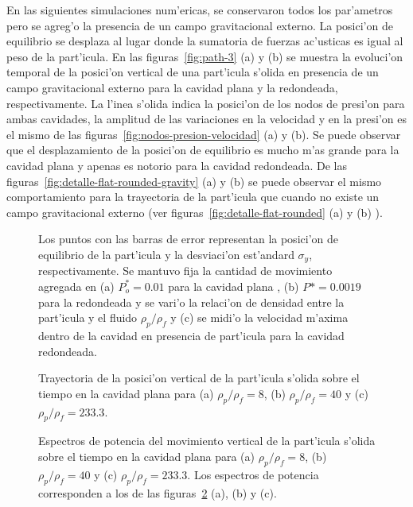 En las siguientes simulaciones num'ericas, se conservaron todos los par'ametros pero se agreg'o
la presencia de un campo gravitacional externo.  La posici'on de equilibrio se desplaza al lugar donde
la sumatoria de fuerzas ac'usticas es igual al peso de la part'icula. En las figuras~\ref{fig:path-3} (a)
y (b)  se muestra la evoluci'on temporal de la posici'on vertical de una part'icula s'olida en presencia 
de un campo gravitacional externo para la cavidad plana y la redondeada, respectivamente. 
La l'inea s'olida indica la posici'on de los nodos de presi'on para ambas cavidades, la amplitud de las variaciones en la
velocidad y en la presi'on es el mismo de las figuras~\ref{fig:nodos-presion-velocidad} (a) y (b).  
Se puede observar que el desplazamiento de la posici'on de equilibrio es mucho m'as grande para la cavidad plana y 
apenas es notorio para la cavidad redondeada. 
De las figuras~\ref{fig:detalle-flat-rounded-gravity} (a) y (b) se puede observar el mismo comportamiento para la trayectoria
de la part'icula que cuando no existe un campo gravitacional externo 
(ver figuras~\ref{fig:detalle-flat-rounded} (a) y (b) ).






\begin{figure}



\caption{\label{fig:barrido-rho}
Los puntos con las barras de error representan la posici'on de equilibrio de la part'icula y
la desviaci'on est'andard $\sigma_y$, respectivamente. Se mantuvo fija la cantidad de movimiento
agregada en  (a) $P_o^\ast=0.01$ para la cavidad plana , (b) $P\ast=0.0019$ para la redondeada y 
se vari'o la relaci'on de densidad entre la part'icula y el fluido $\rho_p/\rho_f$ y (c) se midi'o
la velocidad m'axima dentro de la cavidad en presencia de part'icula  para la cavidad redondeada.
}
\end{figure}
%
\begin{figure}



\caption{\label{fig:paths-flat}
Trayectoria de la posici'on vertical de la part'icula s'olida sobre el tiempo en la cavidad plana para
(a) $\rho_p/\rho_f = 8$, (b) $\rho_p/\rho_f = 40$ y (c) $\rho_p/\rho_f = 233.3$.}
\end{figure}
%
\begin{figure}



\caption{\label{fig:spectrum-flat}
Espectros de potencia del movimiento vertical de la part'icula s'olida sobre el tiempo en la cavidad plana para
(a) $\rho_p/\rho_f = 8$, (b) $\rho_p/\rho_f = 40$ y (c) $\rho_p/\rho_f = 233.3$. 
Los espectros de potencia corresponden a los de las figuras~\ref{fig:paths-flat} (a), (b) y (c). }
\end{figure}


